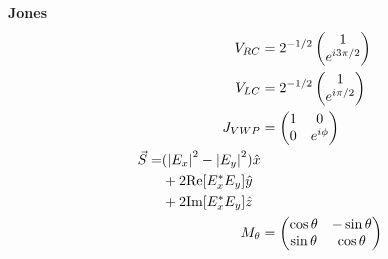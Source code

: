 \documentclass[12pt]{article}
\begin{document}
\begin{multicols}{3}
\textbf{Jones}
\begin{align}
  V_{RC} &= 2^{-1/2} \begin{pmatrix}1\\e^{i3\pi/2}\end{pmatrix}\\
  V_{LC} &= 2^{-1/2} \begin{pmatrix}1\\e^{i\pi/2}\end{pmatrix}\\
  J_{VWP} &= \begin{pmatrix} 1 & 0\\0 & e^{i \phi}\end{pmatrix}\\
  \begin{split}
    \vec{S} {}= &(\abs{E_x}^2 - \abs{E_y}^2) \hat{x}\\
    &+ 2\textrm{Re}[E_x^{*}E_y] \hat{y}\\
    &+ 2\textrm{Im}[E_x^{*}E_y] \hat{z}
  \end{split}\\
  M_{\theta} &= \begin{pmatrix}
    \cos\theta & -\sin\theta\\
    \sin\theta & \cos\theta
  \end{pmatrix}\\
\end{align}

\end{multicols}
\end{document}
